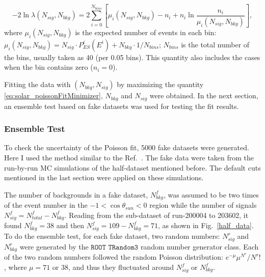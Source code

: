 \begin{equation}\label{eq:solar_poissonFitMinimizer}
-2\ln\mathcal \lambda(N_{sig},N_{bkg})
=2\sum_{i=0}^{N_{bins}}[\mu_i(N_{sig},N_{bkg})-n_i+n_i\ln\frac{n_i}{\mu_i(N_{sig},N_{bkg})}],
\end{equation}
where $\mu_i(N_{sig},N_{bkg})$ is the expected number of events in each bin: $\mu_i(N_{sig},N_{bkg})=N_{sig}\cdot P^i_{ES}(E^i)+N_{bkg}\cdot1/N_{bins}$; $N_{bins}$ is the total number of the bins, usually taken as 40 (per 0.05 bins). This quantity also includes the cases when the bin contains zero ($n_i=0$).

Fitting the data with $(N_{bkg},N_{sig})$ by maximizing the quantity \ref{eq:solar_poissonFitMinimizer}, $N_{bkg}$ and $N_{sig}$ were obtained. In the next section, an ensemble test based on fake datasets was used for testing the fit results.
%
%
\subsubsection{Ensemble Test}
To check the uncertainty of the Poisson fit, 5000 fake datasets were generated. Here I used the method similar to the Ref.~\cite{leta}.
The fake data were taken from the run-by-run MC simulations of the half-dataset mentioned before. The default cuts mentioned in the last section were applied on these simulations.

The number of backgrounds in a fake dataset, $N^f_{bkg}$, was assumed to be two times of the event number in the $-1<\cos\theta_{sun}<0$ region while the number of signals $N^f_{sig}=N^f_{total}-N^f_{bkg}$. Reading from the sub-dataset of run-200004 to 203602, it found $N^f_{bkg}=38$ and then $N^f_{sig}=109-N^f_{bkg}=71$, as shown in Fig.~\ref{half_data}. To do the ensemble test, for each fake dataset, two random numbers: $N^r_{sig}$ and $N^r_{bkg}$ were generated by the $\texttt{ROOT TRandom3}$ random number generator class. Each of the two random numbers followed the random Poisson distribution: $e^{-\mu}\mu^{N^r}/N^r!$, where $\mu=71$ or $38$, and thus they fluctuated around $N^f_{sig}$ or $N^f_{bkg}$.


